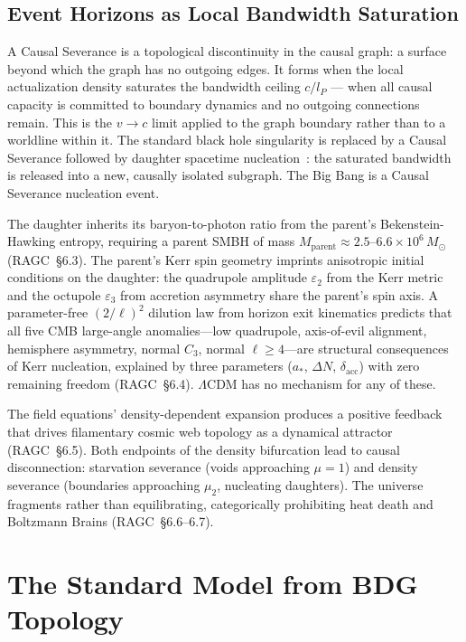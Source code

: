 \documentclass[11pt,a4paper]{article}
\begin{document}
\subsection{Event Horizons as Local Bandwidth Saturation}

A Causal Severance is a topological discontinuity in the causal graph:
a surface beyond which the graph has no outgoing edges. It forms when
the local actualization density saturates the bandwidth ceiling $c/l_P$
--- when all causal capacity is committed to boundary dynamics and no
outgoing connections remain. This is the $v \to c$ limit applied to
the graph boundary rather than to a worldline within it. The standard
black hole singularity is replaced by a Causal Severance followed by
daughter spacetime nucleation~\citep{Sandeman2026RAGC}: the saturated
bandwidth is released into a new, causally isolated subgraph. The
Big Bang is a Causal Severance nucleation event.

The daughter inherits its baryon-to-photon ratio from the parent's
Bekenstein-Hawking entropy, requiring a parent SMBH of mass
$M_{\mathrm{parent}} \approx 2.5$--$6.6 \times 10^6\,M_\odot$
(RAGC~\S6.3). The parent's Kerr spin geometry imprints anisotropic
initial conditions on the daughter: the quadrupole amplitude
$\varepsilon_2$ from the Kerr metric and the octupole
$\varepsilon_3$ from accretion asymmetry share the parent's spin
axis. A parameter-free $(2/\ell)^2$ dilution law from horizon exit
kinematics predicts that all five CMB large-angle anomalies---low
quadrupole, axis-of-evil alignment, hemisphere asymmetry, normal
$C_3$, normal $\ell \geq 4$---are structural consequences of Kerr
nucleation, explained by three parameters ($a_*$, $\Delta N$,
$\delta_{\mathrm{acc}}$) with zero remaining freedom
(RAGC~\S6.4). $\Lambda$CDM has no mechanism for any of these.

The field equations' density-dependent expansion produces a
positive feedback that drives filamentary cosmic web topology as a
dynamical attractor (RAGC~\S6.5). Both endpoints of the density
bifurcation lead to causal disconnection: starvation severance
(voids approaching $\mu = 1$) and density severance (boundaries
approaching $\mu_2$, nucleating daughters). The universe fragments
rather than equilibrating, categorically prohibiting heat death and
Boltzmann Brains (RAGC~\S6.6--6.7).

\section{The Standard Model from BDG Topology}
\label{sec:SM}
\end{document}
